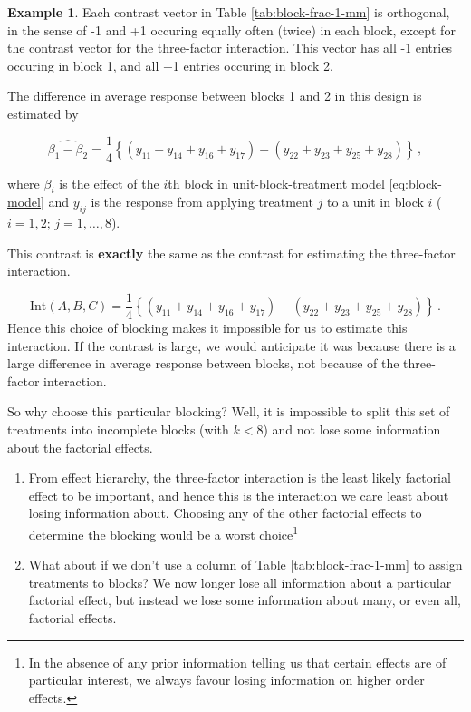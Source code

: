 \documentclass[
]{book}
\theoremstyle{definition}
\theoremstyle{definition}
\newtheorem{example}{Example}[chapter]
\theoremstyle{definition}
\theoremstyle{definition}
\theoremstyle{remark}
\begin{document}
\begin{example}
Each contrast vector in Table \ref{tab:block-frac-1-mm} is orthogonal, in the sense of -1 and +1 occuring equally often (twice) in each block, except for the contrast vector for the three-factor interaction. This vector has all -1 entries occuring in block 1, and all +1 entries occuring in block 2.

The difference in average response between blocks 1 and 2 in this design is estimated by

\[
\widehat{\beta_1 - \beta_2} = \frac{1}{4}\left\{(y_{11} + y_{14} + y_{16}+ y_{17}) - (y_{22} + y_{23} + y_{25} + y_{28})\right\}\,,
\]

where \(\beta_i\) is the effect of the \(i\)th block in unit-block-treatment model \eqref{eq:block-model} and \(y_{ij}\) is the response from applying treatment \(j\) to a unit in block \(i\) (\(i = 1, 2;\, j = 1, \ldots, 8\)).

This contrast is \textbf{exactly} the same as the contrast for estimating the three-factor interaction.

\[
\mathrm{Int}(A, B, C) = \frac{1}{4}\left\{(y_{11} + y_{14} + y_{16}+ y_{17}) - (y_{22} + y_{23} + y_{25} + y_{28})\right\}\,.
\]
Hence this choice of blocking makes it impossible for us to estimate this interaction. If the contrast is large, we would anticipate it was because there is a large difference in average response between blocks, not because of the three-factor interaction.

So why choose this particular blocking? Well, it is impossible to split this set of treatments into incomplete blocks (with \(k<8\)) and not lose some information about the factorial effects.

\begin{enumerate}
\def\labelenumi{\arabic{enumi}.}
\item
  From effect hierarchy, the three-factor interaction is the least likely factorial effect to be important, and hence this is the interaction we care least about losing information about. Choosing any of the other factorial effects to determine the blocking would be a worst choice\footnote{In the absence of any prior information telling us that certain effects are of particular interest, we always favour losing information on higher order effects.}
\item
  What about if we don't use a column of Table \ref{tab:block-frac-1-mm} to assign treatments to blocks? We now longer lose all information about a particular factorial effect, but instead we lose some information about many, or even all, factorial effects.
\end{enumerate}


\end{example}
\end{document}
